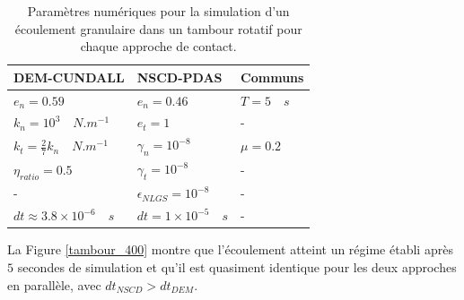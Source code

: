 \vspace{-1cm}

\begin{center}
\begin{table}[!h]
\begin{tabular}{ |p{5cm}|p{3.8cm}|p{3.4cm}| }
 \hline \rowcolor{lightgray}
 DEM-CUNDALL& NSCD-PDAS& Communs\\
 \hline
 $e_n = 0.59$ & $e_n = 0.46$ & $T = 5 \quad s$\\
 $k_n = 10^3 \quad N.m^{-1}$& $e_t = 1$ & -\\
 $k_t = \frac{2}{7} k_n \quad N.m^{-1}$ & $\gamma_n = 10^{-8}$ & $\mu = 0.2$\\
 $\eta_{ratio} = 0.5$ & $\gamma_t = 10^{-8}$ & -\\
 - & $\epsilon_{NLGS} =  10^{-8}$ & -\\
 $dt \approx 3.8\times10^{-6} \quad s$ &$dt = 1\times10^{-5} \quad s$ &-\\
 \hline
\end{tabular}
\caption{Paramètres numériques pour la simulation d'un écoulement granulaire dans un tambour rotatif pour chaque approche de contact.}\label{tab_46}
\end{table}
\end{center}

\vspace{-1cm}

La Figure \ref{tambour_400} montre que l'écoulement atteint un régime établi après $5$ secondes de simulation et qu'il est quasiment identique pour les deux approches en parallèle, avec $dt_{NSCD}>dt_{DEM}$.

